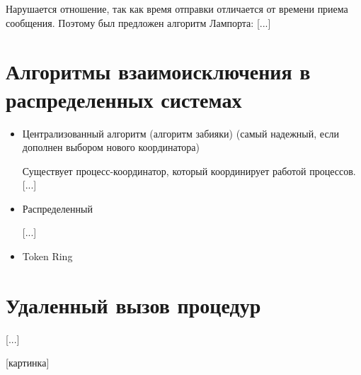 \documentclass[a4paper, 12pt]{report}
\begin{document}
	Нарушается отношение, так как время отправки отличается от времени приема сообщения. Поэтому был предложен алгоритм Лампорта: [...]
	
	\section*{Алгоритмы взаимоисключения в распределенных системах}
	
	\begin{itemize}
		\item Централизованный алгоритм (алгоритм забияки) (самый надежный, если дополнен выбором нового координатора)
		
		Существует процесс-координатор, который координирует работой процессов. [...]
		
		\item Распределенный
		
		[...]
		
		\item Token Ring
	\end{itemize}

	\section*{Удаленный вызов процедур}
	
	[...]
	
	[картинка]
\end{document}
